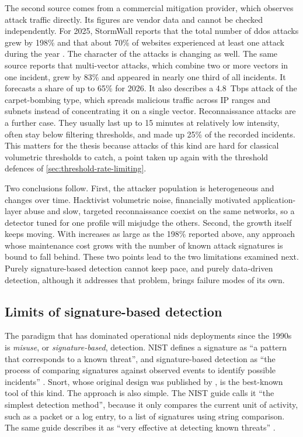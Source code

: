The second source comes from a commercial mitigation provider, which
observes attack traffic directly. Its figures are vendor data and cannot be
checked independently. For 2025, StormWall reports that the total number of
\gls{ddos} attacks grew by 198\% and that about 70\% of websites
experienced at least one attack during the year
\citep{stormwall2026forecast}. The character of the attacks is changing as
well. The same source reports that multi-vector attacks, which combine two
or more vectors in one incident, grew by 83\% and appeared in nearly one
third of all incidents. It forecasts a share of up to 65\% for 2026. It also
describes a 4.8~Tbps attack of the carpet-bombing type, which spreads
malicious traffic across IP ranges and subnets instead of concentrating it
on a single vector. Reconnaissance attacks are a further case. They usually
last up to 15 minutes at relatively low intensity, often stay below
filtering thresholds, and made up 25\% of the recorded incidents. This
matters for the thesis because attacks of this kind are hard for classical
volumetric thresholds to catch, a point taken up again with the threshold
defences of \cref{sec:threshold-rate-limiting}.

Two conclusions follow. First, the attacker population is heterogeneous and
changes over time. Hacktivist volumetric noise, financially motivated
application-layer abuse and slow, targeted reconnaissance coexist on the
same networks, so a detector tuned for one profile will misjudge the
others. Second, the growth itself keeps moving. With increases as large as
the 198\% reported above, any approach whose maintenance cost grows with the
number of known attack signatures is bound to fall behind. These two points
lead to the two limitations examined next. Purely signature-based detection
cannot keep pace, and purely data-driven detection, although it addresses
that problem, brings failure modes of its own.

\subsection{Limits of signature-based detection}
\label{sec:signature-not-enough}

The paradigm that has dominated operational \gls{nids} deployments since the
1990s is \emph{misuse}, or \emph{signature-based}, detection. NIST defines a
signature as ``a pattern that corresponds to a known threat'', and
signature-based detection as ``the process of comparing signatures against
observed events to identify possible incidents''
\citep{scarfone2007nist80094}. Snort, whose original design was published by
\citet{roesch1999snort}, is the best-known tool of this kind. The approach
is also simple. The NIST guide calls it ``the simplest detection method'',
because it only compares the current unit of activity, such as a packet or a
log entry, to a list of signatures using string comparison. The same guide
describes it as ``very effective at detecting known threats''
\citep{scarfone2007nist80094}.

